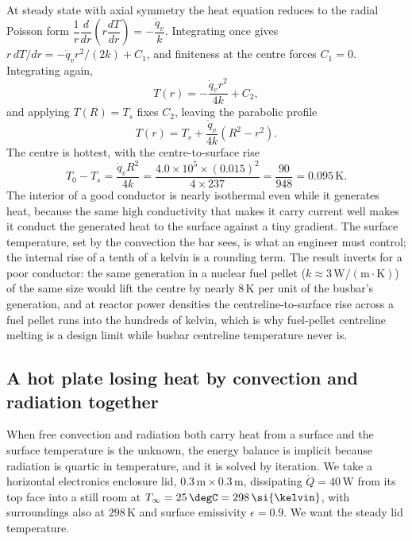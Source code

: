 At steady state with axial symmetry the heat equation reduces to the radial
Poisson form $\dfrac{1}{r}\dfrac{d}{dr}\!\left(r\dfrac{dT}{dr}\right) =
-\dfrac{\dot{q}_v}{k}$. Integrating once gives $r\,dT/dr = -\dot{q}_v r^2/(2k) +
C_1$, and finiteness at the centre forces $C_1 = 0$. Integrating again,
\[
T(r) = -\frac{\dot{q}_v r^2}{4k} + C_2,
\]
and applying $T(R) = T_s$ fixes $C_2$, leaving the parabolic profile
\[
T(r) = T_s + \frac{\dot{q}_v}{4k}\left(R^2 - r^2\right).
\]
The centre is hottest, with the centre-to-surface rise
\[
T_0 - T_s = \frac{\dot{q}_v R^2}{4k} = \frac{4.0\times10^{5}\times(0.015)^2}{4
\times 237} = \frac{90}{948} = 0.095\,\si{\kelvin}.
\]
The interior of a good conductor is nearly isothermal even while it generates
heat, because the same high conductivity that makes it carry current well makes
it conduct the generated heat to the surface against a tiny gradient. The
surface temperature, set by the convection the bar sees, is what an engineer
must control; the internal rise of a tenth of a kelvin is a rounding term. The
result inverts for a poor conductor: the same generation in a nuclear fuel
pellet ($k \approx 3\,\text{W}/(\text{m}\cdot\si{\kelvin})$) of the same size
would lift the centre by nearly $8\,\si{\kelvin}$ per unit of the busbar's
generation, and at reactor power densities the centreline-to-surface rise across
a fuel pellet runs into the hundreds of kelvin, which is why fuel-pellet
centreline melting is a design limit while busbar centreline temperature never
is.

\subsection{A hot plate losing heat by convection and radiation together}

When free convection and radiation both carry heat from a surface and the
surface temperature is the unknown, the energy balance is implicit because
radiation is quartic in temperature, and it is solved by iteration. We take a
horizontal electronics enclosure lid, $0.3\,\text{m}\times 0.3\,\text{m}$,
dissipating $\dot{Q} = 40\,\text{W}$ from its top face into a still room at
$T_\infty = 25\,\degC = 298\,\si{\kelvin}$, with surroundings also at
$298\,\si{\kelvin}$ and surface emissivity $\epsilon = 0.9$. We want the steady
lid temperature.

